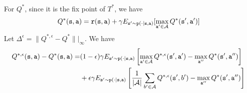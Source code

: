 \begin{advanced}
\begin{align*}
\end{align*}
For $Q^{*}$, since it is the fix point of $T^{*}$, we have
\[
  Q^{*}({\tt s},{\tt a}) = {\tt r}({\tt s},{\tt a})+\gamma E_{{\tt s}'\sim{\tt p}(\cdot|{\tt s},{\tt a})}[\max_{{\tt a}'\in\mathcal{A}}Q^{*}({\tt s}',{\tt a}')]
\]
Let $\Delta^\epsilon=\|Q^{*,\epsilon}-Q^*\||_\infty$. We have
\begin{align*}
    Q^{*,\epsilon}(\state,\action) -Q^{*}(\state,\action) =& %
    (1-\epsilon)\discount E_{\state'\sim\transitionprob(\cdot|\state,\action)}\left[\max_{\action'\in\Actions}Q^{*,\epsilon}(\state',\action')-\max_{\action''}Q^{*}(\state',\action'')\right] \\
    & +\epsilon\discount E_{\state'\sim\transitionprob(\cdot|\state,\action)}\left[ \frac{1}{|\Actions|}\sum_{b'\in\Actions} Q^{*,\epsilon} (\state',b') - \max_{\action''}Q^{*}(\state',\action'')\right]\\

\end{align*}
\end{advanced}
